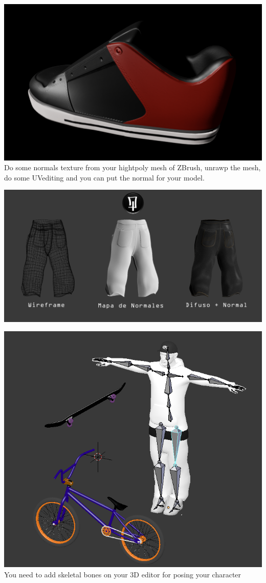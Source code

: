 \documentclass{article}
\begin{document}
  \includegraphics[width=\textwidth]{19.png}
  Do some normals texture from your hightpoly mesh of ZBrush, unrawp the mesh, do some UVediting and you can put the normal for your model.

  \includegraphics[width=\textwidth]{6.png}
  
  \includegraphics[width=\textwidth]{10.png}
  You need to add skeletal bones on your 3D editor for posing your character
\end{document}
